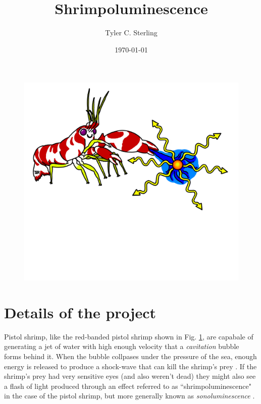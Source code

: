 \documentclass[prb,aps,12pt,superscriptaddress,floatfix]{revtex4-2}
\begin{document}
\title{\huge Shrimpoluminescence}

\author{\large Tyler C. Sterling}

\date{\today}


\maketitle



\begin{figure}
\includegraphics[width=1\linewidth]{figs/shrimpy.pdf}
\label{fig:shrimpy}
\end{figure}

 
\newpage

\section{Details of the project}
Pistol shrimp, like the red-banded pistol shrimp shown in Fig. \ref{fig:shrimpy}, are capabale of generating a jet of water with high enough velocity that a \emph{cavitation} bubble forms behind it. When the bubble collpases under the pressure of the sea, enough energy is released to produce a shock-wave that can kill the shrimp's prey \cite{}. If the shrimp's prey had very sensitive eyes (and also weren't dead) they might also see a flash of light produced through an effect referred to as ``shrimpoluminescence" in the case of the pistol shrimp, but more generally known as \emph{sonoluminescence} \cite{}.
\end{document}
